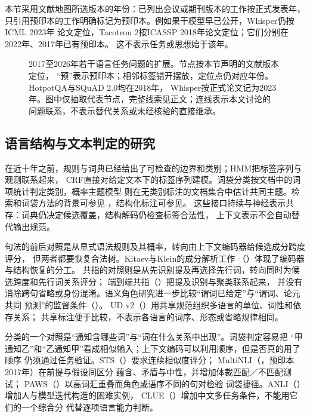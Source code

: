 本节采用文献地图所选版本的年份：已列出会议或期刊版本的工作按正式发表年，
只引用预印本的工作明确标记为预印本。例如果干模型早已公开，Whisper仍按ICML 2023年
论文定位，Tacotron 2按ICASSP 2018年论文定位；它们分别在2022年、2017年已有预印本。
这不表示任务或思想始于该年。

\begin{figure}[htbp]
  \centering
  
  \caption{2017至2026年若干语言任务问题的扩展。节点按本节声明的文献版本定位，
  “预”表示预印本；相邻标签错开摆放，定位点仍对应年份。HotpotQA与SQuAD 2.0均在2018年，
  Whisper按正式论文记为2023年。图中仅抽取代表节点，完整线索见正文；连线表示本文讨论的
  问题联系，不表示替代关系或未经核验的直接继承。}
  \label{fig:nlp-task-history}
\end{figure}

\FloatBarrier
\subsection{语言结构与文本判定的研究}
\label{sec:nlp-history-analysis-judgment}

在近十年之前，规则与词典已经给出了可检查的边界和类别；HMM把标签序列与观测联系起来，
CRF直接对给定文本下的标签序列建模。词袋分类按文档中的词项统计判定类别，概率主题模型
则在无类别标注的文档集合中估计共同主题。检索和词袋方法的背景可参见
，结构化标注可参见。
这些接口持续与神经表示共存：词典仍决定候选覆盖，结构解码仍检查标签合法性，
上下文表示不会自动替代输出规范。

句法的前后对照是从显式语法规则及其概率，转向由上下文编码器给候选成分跨度评分，
但两者都要恢复合法树。Kitaev与Klein的成分解析工作
（\citeyear{nlp-intro-kitaev2018}）体现了编码器与结构恢复的分工。
共指的对照则是从先识别提及再选择先行词，转向同时为候选跨度和先行词关系评分；
端到端共指（\citeyear{lee2017coreference}）把提及识别与聚类联系起来，
并没有消除跨句省略或身份混淆。语义角色研究进一步比较“谓词已给定”与“谓词、论元共同
预测”的监督条件（\citeyear{nlp-intro-he2018}）。
UD v2（\citeyear{nivre2020universal}）用共享规范组织多语言的单位、词性和依存关系；
共享标注便于比较，不表示各语言的词序、形态或省略规律相同。

分类的一个对照是“通知含哪些词”与“词在什么关系中出现”。词袋判定容易把
“甲通知乙”和“乙通知甲”看成相似输入；上下文编码可以利用顺序，但是否真的用了顺序
仍须通过任务验证。STS（\citeyear{nlp-intro-cer2017}）要求连续相似度评分；
MultiNLI（\citeyear{nlp-intro-williams2018}，预印本2017年）在前提与假设间区分
蕴含、矛盾与中性，并增加体裁匹配／不匹配测试；
PAWS（\citeyear{nlp-intro-zhang2019paws}）以高词汇重叠而角色或语序不同的句对检验
词袋捷径。ANLI（\citeyear{nlp-intro-nie2020}）增加人与模型迭代构造的困难实例，
CLUE（\citeyear{nlp-intro-xu2020clue}）增加中文多任务条件，不能用它们的一个综合分
代替逐项语言能力判断。

